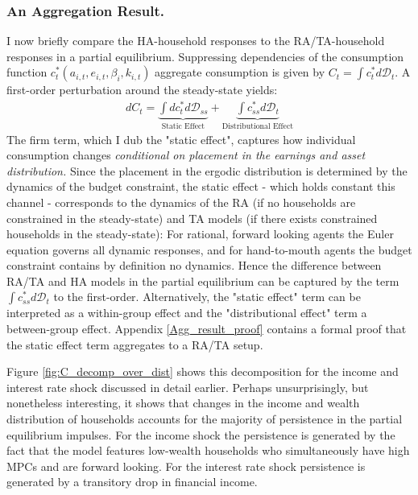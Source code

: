

\subsubsection{An Aggregation Result.} I now briefly compare the HA-household responses to the RA/TA-household responses in a partial equilibrium. Suppressing dependencies of the consumption function $c_{t}^{*}\left(a_{i,t},e_{i,t},\beta_{i},k_{i,t}\right)$ aggregate consumption is given by $C_{t}=\int c_{t}^{*}d\mathcal{D}_{t}$. A first-order perturbation around the steady-state yields: 
\begin{gather*}
dC_{t}= \underbrace{\int dc_{t}^{*}d\mathcal{D}_{ss} }_{\text{Static Effect}} + \underbrace{\int c_{ss}^{*}d\mathcal{D}_{t}}_{\text{Distributional Effect}} 
\end{gather*}
The firm term, which I dub the "static effect", captures how individual consumption changes \textit{conditional on placement in the earnings and asset distribution.} Since the placement in the ergodic distribution is determined by the dynamics of the budget constraint, the static effect - which holds constant this channel - corresponds to the dynamics of the RA (if no households are constrained in the steady-state) and TA models (if there exists constrained households in the steady-state): For rational, forward looking agents the Euler equation governs all dynamic responses, and for hand-to-mouth agents the budget constraint contains by definition no dynamics. Hence the difference between RA/TA and HA models in the partial equilibrium can be captured by the term $\int c_{ss}^{*}d\mathcal{D}_{t}$ to the first-order. Alternatively, the "static effect" term can be interpreted as a within-group effect and the "distributional effect" term a between-group effect. Appendix \ref{Agg_result_proof} contains a formal proof that the static effect term aggregates to a RA/TA setup.

Figure \ref{fig:C_decomp_over_dist} shows this decomposition for the income and interest rate shock discussed in detail earlier. Perhaps unsurprisingly, but nonetheless interesting, it shows that changes in the income and wealth distribution of households accounts for the majority of persistence in the partial equilibrium impulses. For the income shock the persistence is generated by the fact that the model features low-wealth households who simultaneously have high MPCs and are forward looking. For the interest rate shock persistence is generated by a transitory drop in financial income. 


